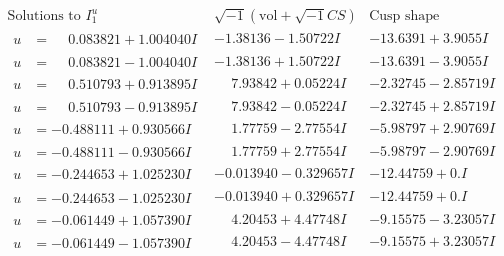 \documentclass[1p]{elsarticle_modified}
\theoremstyle{definition}
\newcommand{\I}{\sqrt{-1}}
\begin{document}
$$\begin{array}{c|c|c}  
\text{Solutions to }I^u_{1}& \I (\text{vol} + \sqrt{-1}CS) & \text{Cusp shape}\\
 \hline 
\begin{aligned}
u &= \phantom{-}0.083821 + 1.004040 I\end{aligned}
 & -1.38136 - 1.50722 I & -13.6391 + 3.9055 I \\ \hline\begin{aligned}
u &= \phantom{-}0.083821 - 1.004040 I\end{aligned}
 & -1.38136 + 1.50722 I & -13.6391 - 3.9055 I \\ \hline\begin{aligned}
u &= \phantom{-}0.510793 + 0.913895 I\end{aligned}
 & \phantom{-}7.93842 + 0.05224 I & -2.32745 - 2.85719 I \\ \hline\begin{aligned}
u &= \phantom{-}0.510793 - 0.913895 I\end{aligned}
 & \phantom{-}7.93842 - 0.05224 I & -2.32745 + 2.85719 I \\ \hline\begin{aligned}
u &= -0.488111 + 0.930566 I\end{aligned}
 & \phantom{-}1.77759 - 2.77554 I & -5.98797 + 2.90769 I \\ \hline\begin{aligned}
u &= -0.488111 - 0.930566 I\end{aligned}
 & \phantom{-}1.77759 + 2.77554 I & -5.98797 - 2.90769 I \\ \hline\begin{aligned}
u &= -0.244653 + 1.025230 I\end{aligned}
 & -0.013940 - 0.329657 I & -12.44759 + 0. I\phantom{ +0.000000I} \\ \hline\begin{aligned}
u &= -0.244653 - 1.025230 I\end{aligned}
 & -0.013940 + 0.329657 I & -12.44759 + 0. I\phantom{ +0.000000I} \\ \hline\begin{aligned}
u &= -0.061449 + 1.057390 I\end{aligned}
 & \phantom{-}4.20453 + 4.47748 I & -9.15575 - 3.23057 I \\ \hline\begin{aligned}
u &= -0.061449 - 1.057390 I\end{aligned}
 & \phantom{-}4.20453 - 4.47748 I & -9.15575 + 3.23057 I \\ \hline\begin{aligned}

\end{aligned}
\end{array}$$
\end{document}
